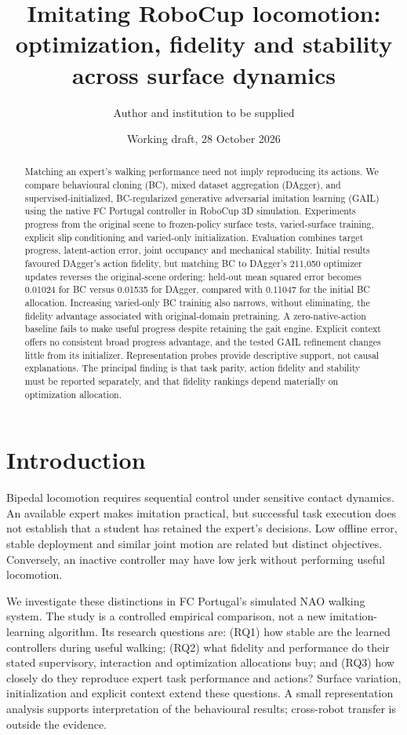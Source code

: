 \documentclass[10pt,a4paper,twocolumn]{article}
\title{Imitating RoboCup locomotion: optimization, fidelity and stability across surface dynamics}
\author{Author and institution to be supplied}
\date{Working draft, 28 October 2026}
\begin{document}
\maketitle


\begin{abstract}

Matching an expert's walking performance need not imply reproducing its actions. We compare behavioural cloning (BC), mixed dataset aggregation (DAgger), and supervised-initialized, BC-regularized generative adversarial imitation learning (GAIL) using the native FC Portugal controller in RoboCup 3D simulation. Experiments progress from the original scene to frozen-policy surface tests, varied-surface training, explicit slip conditioning and varied-only initialization. Evaluation combines target progress, latent-action error, joint occupancy and mechanical stability. Initial results favoured DAgger's action fidelity, but matching BC to DAgger's 211,050 optimizer updates reverses the original-scene ordering: held-out mean squared error becomes 0.01024 for BC versus 0.01535 for DAgger, compared with 0.11047 for the initial BC allocation. Increasing varied-only BC training also narrows, without eliminating, the fidelity advantage associated with original-domain pretraining. A zero-native-action baseline fails to make useful progress despite retaining the gait engine. Explicit context offers no consistent broad progress advantage, and the tested GAIL refinement changes little from its initializer. Representation probes provide descriptive support, not causal explanations. The principal finding is that task parity, action fidelity and stability must be reported separately, and that fidelity rankings depend materially on optimization allocation.

\end{abstract}

\section{Introduction}

Bipedal locomotion requires sequential control under sensitive contact dynamics. An available expert makes imitation practical, but successful task execution does not establish that a student has retained the expert's decisions. Low offline error, stable deployment and similar joint motion are related but distinct objectives. Conversely, an inactive controller may have low jerk without performing useful locomotion.

We investigate these distinctions in FC Portugal's simulated NAO walking system. The study is a controlled empirical comparison, not a new imitation-learning algorithm. Its research questions are: (RQ1) how stable are the learned controllers during useful walking; (RQ2) what fidelity and performance do their stated supervisory, interaction and optimization allocations buy; and (RQ3) how closely do they reproduce expert task performance and actions? Surface variation, initialization and explicit context extend these questions. A small representation analysis supports interpretation of the behavioural results; cross-robot transfer is outside the evidence.
\end{document}
